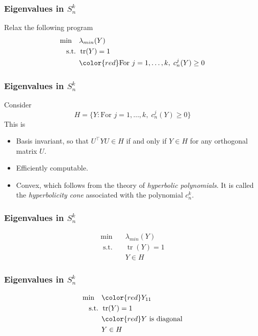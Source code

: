 \documentclass{beamer}
\DeclareMathOperator{\tr}{tr}
\newcommand{\st}{{\text{ s.t. }}}
\begin{document}
\begin{frame}
    \frametitle{Eigenvalues in $S^k_n$}
    Relax the following program
    \begin{equation}
        \begin{aligned}
            \min\quad & \lambda_{min}(Y)\\
            \st & \tr(Y) = 1\\
                & {\color{red}\text{For }j=1 ,\dots, k,\; c_n^j(Y) \ge 0}\\
        \end{aligned}
    \end{equation}
\end{frame}
\begin{frame}
    \frametitle{Eigenvalues in $S^k_n$}
    Consider
    \[
        H = \{Y : \text{For }j=1 ,\dots, k,\; c_n^j(Y) \ge 0\}
    \]
    \pause This is
    \begin{itemize}
        \item Basis invariant, so that $U^{\intercal} Y U \in H$ if and only if $Y \in H$ for any orthogonal matrix $U$.
        \pause
        \item Efficiently computable.
        \pause
        \item Convex, which follows from the theory of \emph{hyperbolic polynomials}. It is called the \emph{hyperbolicity cone} associated with the polynomial $c_n^k$.
    \end{itemize}
\end{frame}
\begin{frame}
    \frametitle{Eigenvalues in $S^k_n$}
    \begin{equation}
        \begin{aligned}
            \min\quad & \lambda_{min}(Y)\\
            \st & \tr(Y) = 1\\
                & Y \in H
        \end{aligned}
    \end{equation}
\end{frame}
\begin{frame}
    \frametitle{Eigenvalues in $S^k_n$}
    \begin{equation}
        \begin{aligned}
            \min\quad & {\color{red}Y_{11}}\\
            \st & \tr(Y) = 1\\
                & {\color{red}Y \text{ is diagonal}}\\
                & Y \in H
        \end{aligned}
    \end{equation}
\end{frame}
\end{document}

